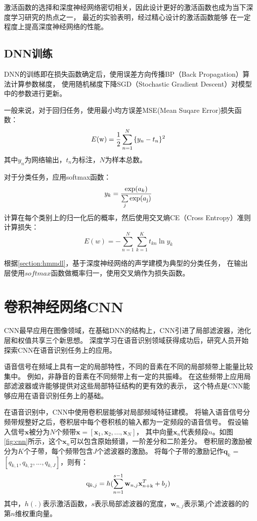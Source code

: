 激活函数的选择和深度神经网络密切相关，因此设计更好的激活函数也成为当下深度学习研究的热点之一，
最近的实验表明，经过精心设计的激活函数能够
在一定程度上提高深度神经网络的性能。

\subsection{DNN训练}

DNN的训练即在损失函数确定后，使用误差方向传播BP（Back Propagation）算法计算参数梯度，
使用随机梯度下降SGD（Stochastic Gradient Descent）对模型中的参数进行更新。

一般来说，对于回归任务，使用最小均方误差MSE(Mean Suqare Error)损失函数：
\begin{equation}
E({\rm{w}}) = \frac{1}{2}\sum\limits_{n = 1}^N {\{ {y_n}}  - {t_n}{\} ^2}
\end{equation}
其中$y_n$为网络输出，$t_n$为标注，$N$为样本总数。

对于分类任务，应用softmax函数：
\begin{equation}
\label{equation:softmax}
{y_k} = \frac{{\exp ({a_k})}}{{\sum\limits_j {\exp ({a_{\rm{j}}})} }}
\end{equation}
计算在每个类别上的归一化后的概率，然后使用交叉熵CE（Cross Entropy）准则计算损失：
\begin{equation}
E(w) =  - \sum\limits_{n = 1}^N {\sum\limits_{k = 1}^K {{t_{kn}}\ln {y_k}} }
\end{equation}

根据\ref{section:hmmdl}，基于深度神经网络的声学建模为典型的分类任务，
在输出层使用$softmax$函数做概率归一，使用交叉熵作为损失函数。

\section{卷积神经网络CNN}

CNN最早应用在图像领域，在基础DNN的结构上，CNN引进了局部滤波器，池化层和权值共享三个新思想。
深度学习在语音识别领域获得成功后，研究人员开始探索CNN在语音识别任务上的应用。

语音信号在频域上具有一定的局部特性，不同的音素在不同的局部频带上能量比较集中。
例如，非静音的音素在不同频带上有一定的共振峰。
在这些频带上应用局部滤波器或许能够提供对这些局部特征结构的更有效的表示，
这个特点是CNN能够应用在语音识别任务上的基础。

在语音识别中，CNN中使用卷积层能够对局部频域特征建模。
将输入语音信号分频带规整好之后，卷积层中每个卷积核的输入都为一定频段的语音信号。
假设输入信号$\textbf{x}$被分为$N$个频带$\textbf{x}= [\textbf{x}_1, \textbf{x}_2, ..., \textbf{x}_N]$，
其中向量$\textbf{x}_n$代表频段$n$。如图\ref{fig:cnn}所示，这个$\textbf{x}_n$可以包含原始频谱，一阶差分和二阶差分。
卷积层的激励被分为$K$个子带，每个频带包含$J$个滤波器的激励。
将每个子带的激励记作$\textbf{q}_k$ = $[q_{k,1}, q_{k,2}, ..., q_{k, J}]$，则有：
\begin{equation}
{{\rm{q}}_{k,j}} = h(\sum\limits_{n = 1}^{s - 1} {{\textbf{w}_{n,j}}\textbf{x}_{n{\rm{ + k}}}^T + {b_j})}
\end{equation}
其中，$h(.)$表示激活函数，$s$表示局部滤波器的宽度，$\textbf{w}_{n,j}$表示第$j$个滤波器的的第$n$维权重向量。


